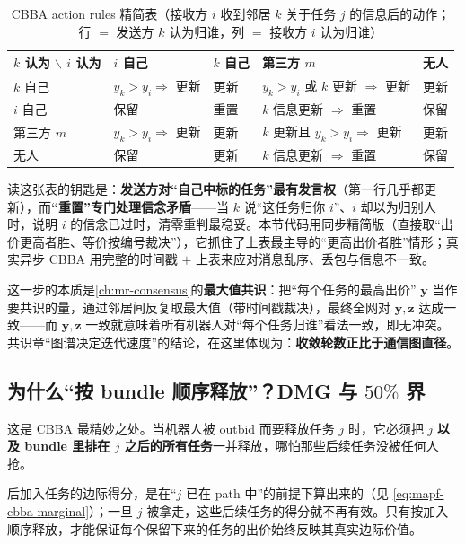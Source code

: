 \begin{table}[H]\centering\small
\caption{CBBA action rules 精简表（接收方 $i$ 收到邻居 $k$ 关于任务 $j$ 的信息后的动作；行 $=$ 发送方 $k$ 认为归谁，列 $=$ 接收方 $i$ 认为归谁）}
\label{tab:mapf-cbba-rules}
\begin{tabular}{lllll}
\toprule
$k$ 认为 $\backslash$ $i$ 认为 & $i$ 自己 & $k$ 自己 & 第三方 $m$ & 无人 \\
\midrule
$k$ 自己 & $y_k>y_i\Rightarrow$ 更新 & 更新 & $y_k>y_i$ 或 $k$ 更新 $\Rightarrow$ 更新 & 更新 \\
$i$ 自己 & 保留 & 重置 & $k$ 信息更新 $\Rightarrow$ 重置 & 保留 \\
第三方 $m$ & $y_k>y_i\Rightarrow$ 更新 & 更新 & $k$ 更新且 $y_k>y_i\Rightarrow$ 更新 & 更新 \\
无人 & 保留 & 更新 & $k$ 信息更新 $\Rightarrow$ 重置 & 保留 \\
\bottomrule
\end{tabular}
\end{table}

读这张表的钥匙是：\textbf{发送方对“自己中标的任务”最有发言权}（第一行几乎都更新），而\textbf{“重置”专门处理信念矛盾}——当 $k$ 说“这任务归你 $i$”、$i$ 却以为归别人时，说明 $i$ 的信念已过时，清零重判最稳妥。本节代码用同步精简版（直接取“出价更高者胜、等价按编号裁决”），它抓住了上表最主导的“更高出价者胜”情形；真实异步 CBBA 用完整的时间戳 $+$ 上表来应对消息乱序、丢包与信息不一致。

\begin{insight}
这一步的本质是\cref{ch:mr-consensus}的\textbf{最大值共识}：把“每个任务的最高出价” $\mathbf{y}$ 当作要共识的量，通过邻居间反复取最大值（带时间戳裁决），最终全网对 $\mathbf{y},\mathbf{z}$ 达成一致——而 $\mathbf{y},\mathbf{z}$ 一致就意味着所有机器人对“每个任务归谁”看法一致，即无冲突。共识章“图谱决定迭代速度”的结论，在这里体现为：\textbf{收敛轮数正比于通信图直径}。
\end{insight}

\subsection{为什么“按 bundle 顺序释放”？DMG 与 $50\%$ 界}
\label{sec:mapf-cbba-bound}

这是 CBBA 最精妙之处。当机器人被 outbid 而要释放任务 $j$ 时，它必须把 $j$ \textbf{以及 bundle 里排在 $j$ 之后的所有任务}一并释放，哪怕那些后续任务没被任何人抢。

\begin{insight}[释放纪律的理由]
后加入任务的边际得分，是在“$j$ 已在 path 中”的前提下算出来的（见 \cref{eq:mapf-cbba-marginal}）；一旦 $j$ 被拿走，这些后续任务的得分就不再有效。只有按加入顺序释放，才能保证每个保留下来的任务的出价始终反映其真实边际价值。
\end{insight}

